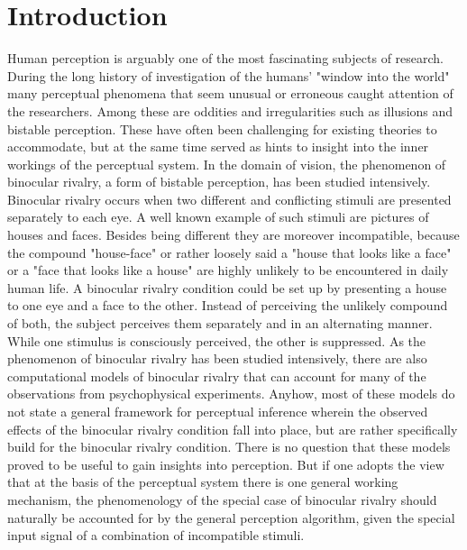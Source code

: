 \documentclass{frontiersSCNS} %
\begin{document}
\section{Introduction}

%
%
Human perception is arguably one of the most fascinating subjects of research. During the long history of investigation of the humans' "window into the world" many perceptual phenomena that seem unusual or erroneous caught attention of the researchers. Among these are oddities and irregularities such as illusions and bistable perception. These have often been challenging for existing theories to accommodate, but at the same time served as hints to insight into the inner workings of the perceptual system. In the domain of vision, the phenomenon of  binocular rivalry, a form of bistable perception, has been studied intensively. Binocular rivalry occurs when two different and conflicting stimuli are presented separately to each eye. A well known example of such stimuli are pictures of houses and faces. Besides being different they are moreover incompatible, because the compound "house-face" or rather loosely said a "house that looks like a face" or a "face that looks like a house" are highly unlikely to be encountered in daily human life. A binocular rivalry condition could be set up by presenting a house to one eye and a face to the other. Instead of perceiving the unlikely compound of both, the subject perceives them separately and in an alternating manner. While one stimulus is consciously perceived, the other is suppressed.  
    As the phenomenon of binocular rivalry has been studied intensively, there are also computational models of binocular rivalry that can account for many of the observations from psychophysical experiments. Anyhow, most of these models do not state a general framework for perceptual inference wherein the observed effects of the binocular rivalry condition fall into place, but are rather specifically build for the binocular rivalry condition. There is no question that these models proved to be useful to gain insights into perception. But if one adopts the view that at the basis of the perceptual system there is one general working mechanism, the phenomenology of the special case of binocular rivalry should naturally be accounted for by the general perception algorithm, given the special input signal of a combination of incompatible stimuli. 
    
\end{document}
